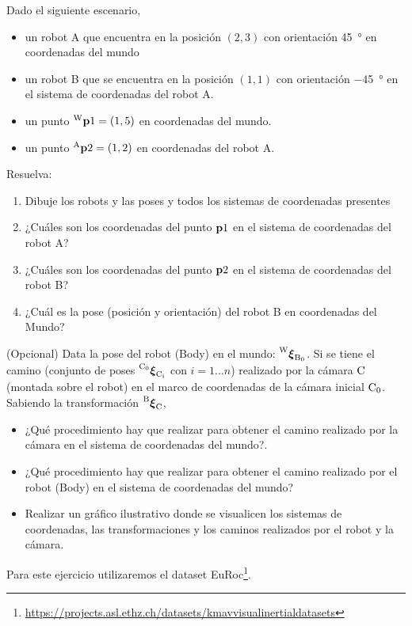 \documentclass[tp]{lcc}
\begin{document}
\ejercicio Dado el siguiente escenario,
\begin{itemize}
    \item un robot A que encuentra en la posición $(2,3)$ con orientación \SI{45}{\degree} en coordenadas del mundo
    \item un robot B que se encuentra en la posición $(1,1)$ con orientación \SI{-45}{\degree} en el sistema de coordenadas del robot A.
    \item un punto $\prescript{\mathrm{\mathrm{W}}}{}{\boldsymbol{\mathbf{p}}}1 = (1,5)$ en coordenadas del mundo.
    \item un punto $\prescript{\mathrm{A}}{}{\boldsymbol{\mathbf{p}}}2 = (1,2)$ en coordenadas del robot A.
\end{itemize}
Resuelva:
\begin{enumerate}
    \item Dibuje los robots y las poses y todos los sistemas de coordenadas presentes
    \item ¿Cuáles son los coordenadas del punto $\boldsymbol{\mathbf{p}}1$ en el sistema de coordenadas del robot A?
    \item ¿Cuáles son los coordenadas del punto $\boldsymbol{\mathbf{p}}2$ en el sistema de coordenadas del robot B?
    \item ¿Cuál es la pose (posición y orientación) del robot B en coordenadas del Mundo?
\end{enumerate}

\ejercicio (Opcional) Data la pose del robot (Body) en el mundo: $\prescript{\mathrm{\mathrm{W}}}{}{{\boldsymbol{\mathbf{\xi}}}_\mathrm{\mathrm{B}_{0}}}$. Si se tiene el camino (conjunto de poses $\prescript{\mathrm{\mathrm{C}_{0}}}{}{{\boldsymbol{\mathbf{\xi}}}_\mathrm{\mathrm{C}_{i}}}$ con $i = 1 \dots n$) realizado por la cámara $\mathrm{C}$ (montada sobre el robot) en el marco de coordenadas de la cámara inicial $\mathrm{C}_{0}$. Sabiendo la transformación $\prescript{\mathrm{\mathrm{B}}}{}{{\boldsymbol{\mathbf{\xi}}}_\mathrm{\mathrm{C}}}$, 
\begin{itemize}
	\item ¿Qué procedimiento hay que realizar para obtener el camino realizado por la cámara en el sistema de coordenadas del mundo?.
	\item ¿Qué procedimiento hay que realizar para obtener el camino realizado por el robot (Body) en el sistema de coordenadas del mundo?
    \item Realizar un gráfico ilustrativo donde se visualicen los sistemas de coordenadas, las transformaciones y los caminos realizados por el robot y la cámara.
\end{itemize}


\ejercicio Para este ejercicio utilizaremos el dataset EuRoc\footnote{\url{https://projects.asl.ethz.ch/datasets/kmavvisualinertialdatasets}}.
\end{document}
